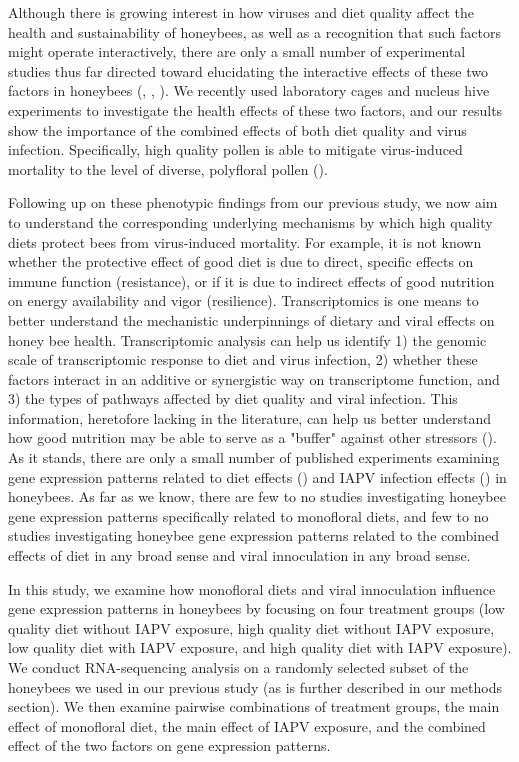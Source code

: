 \documentclass[11pt,a4paper,oldfontcommands,openany]{memoir}
\numberwithin{equation}{section} %
\begin{document}
Although there is growing interest in how viruses and diet quality affect the health and sustainability of honeybees, as well as a recognition that such factors might operate interactively, there are only a small number of experimental studies thus far directed toward elucidating the interactive effects of these two factors in honeybees (\citealt{intNV}, \citealt{intNV2}, \citealt{intNV3}). We recently used laboratory cages and nucleus hive experiments to investigate the health effects of these two factors, and our results show the importance of the combined effects of both diet quality and virus infection. Specifically, high quality pollen is able to mitigate virus-induced mortality to the level of diverse, polyfloral pollen (\citealt{adamInt}). 

Following up on these phenotypic findings from our previous study, we now aim to understand the corresponding underlying mechanisms by which high quality diets protect bees from virus-induced mortality. For example, it is not known whether the protective effect of good diet is due to direct, specific effects on immune function (resistance), or if it is due to indirect effects of good nutrition on energy availability and vigor (resilience). Transcriptomics is one means to better understand the mechanistic underpinnings of dietary and viral effects on honey bee health. Transcriptomic analysis can help us identify 1) the genomic scale of transcriptomic response to diet and virus infection, 2) whether these factors interact in an additive or synergistic way on transcriptome function, and 3) the types of pathways affected by diet quality and viral infection. This information, heretofore lacking in the literature, can help us better understand how good nutrition may be able to serve as a "buffer" against other stressors (\citealt{AdamTothReview}). As it stands, there are only a small number of published experiments examining gene expression patterns related to diet effects (\citealt{alaux2}) and IAPV infection effects (\citealt{galbraith}) in honeybees. As far as we know, there are few to no studies investigating honeybee gene expression patterns specifically related to monofloral diets, and few to no studies investigating honeybee gene expression patterns related to the combined effects of diet in any broad sense and viral innoculation in any broad sense. 

In this study, we examine how monofloral diets and viral innoculation influence gene expression patterns in honeybees by focusing on four treatment groups (low quality diet without IAPV exposure, high quality diet without IAPV exposure, low quality diet with IAPV exposure, and high quality diet with IAPV exposure). We conduct RNA-sequencing analysis on a randomly selected subset of the honeybees we used in our previous study (as is further described in our methods section). We then examine pairwise combinations of treatment groups, the main effect of monofloral diet, the main effect of IAPV exposure, and the combined effect of the two factors on gene expression patterns.
\end{document}
